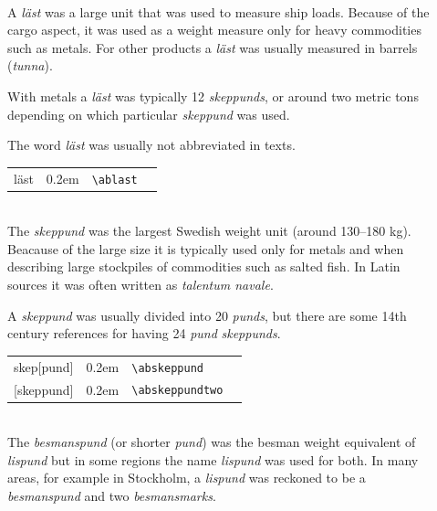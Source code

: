 \documentclass[a4paper]{article}
\newcommand{\samplefont}{\fontsize{16}{16}\abcursivefamily\spaceskip0.2em}
\newcommand{\sample}[1]{{\samplefont #1 \strut}}
\newcommand{\ltxncmd}[1]{\texttt{\textbackslash{}#1}}
\begin{document}
\begin{description}
\item [\sample{läst} \emph{Läst}, \emph{lästi}]
  \mbox{} \\
  A \emph{läst} was a large unit that was used to measure ship loads.
  Because of the cargo aspect, it was used as a weight measure only
  for heavy commodities such as metals. For other products a
  \emph{läst} was usually measured in barrels (\emph{tunna}).

  With metals a \emph{läst} was typically 12 \emph{skeppunds}, or
  around two metric tons depending on which particular \emph{skeppund}
  was used.

  The word \emph{läst} was usually not abbreviated in texts.
  \begin{center}
    \begin{tabular}{llll}
      {}läst  & \sample{\abkolmannes} & \ltxncmd{ablast} \\
    \end{tabular}
  \end{center}

\item [\sample{\abskeppund}, \sample{\abskeppundtwo} \emph{Skeppund},
  \emph{kippunta}, \emph{talentum navale}] \mbox{} \\
  The \emph{skeppund} was the largest Swedish weight unit (around
  130–180 kg). Beacause of the large size it is typically used only
  for metals and when describing large stockpiles of commodities such
  as salted fish. In Latin sources it was often written as
  \emph{talentum navale}.

  A \emph{skeppund} was usually divided into 20 \emph{punds}, but
  there are some 14th century references for having 24 \emph{pund}
  \emph{skeppunds}.

  \begin{center}
    \begin{tabular}{llll}
      {}skep[pund]  & \sample{\abskeppund} & \ltxncmd{abskeppund} \\
      {}[skeppund]  & \sample{\abskeppundtwo} & \ltxncmd{abskeppundtwo} \\
    \end{tabular}
  \end{center}


\item [\sample{\abbesmanspund}, \sample{\abpund}, \sample{\abpundtwo},
  \sample{\abpundthree}, \sample{\abpundfour} \emph{Besmanspund}, \emph{pund}, \emph{leiviskä}] \mbox{} \\
The \emph{besmanspund} (or shorter \emph{pund}) was the besman weight
equivalent of \emph{lispund} but in some regions the name
\emph{lispund} was used for both. In many areas, for example in
Stockholm, a \emph{lispund} was reckoned to be a \emph{besmanspund}
and two \emph{besmansmarks}.


\end{description}
\end{document}
